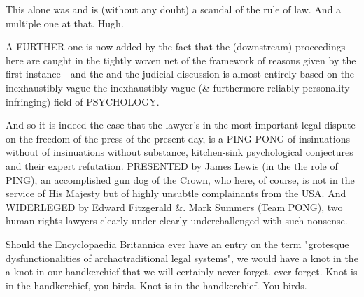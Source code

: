 \begin{multicols}{2}
This alone was and is (without any doubt) a scandal of the rule of law. And a multiple one at that. Hugh.

A FURTHER one is now added by the fact that the
(downstream) proceedings here are caught in the tightly woven net of the framework of reasons given by the first instance - and the
and the judicial discussion is almost entirely based on the inexhaustibly vague
the inexhaustibly vague (\& furthermore reliably personality-infringing) field of PSYCHOLOGY.

And so it is indeed the case that the lawyer's
in the most important legal dispute on the freedom of the press of the present day, is a PING PONG of insinuations without
of insinuations without substance, kitchen-sink psychological conjectures and their expert refutation. PRESENTED by James Lewis (in the
the role of PING), an accomplished gun dog of the
Crown, who here, of course, is not in the service of His Majesty but of highly unsubtle complainants from the
USA. And WIDERLEGED by Edward Fitzgerald \&.
Mark Summers (Team PONG), two human rights lawyers clearly under
clearly underchallenged with such nonsense.

Should the Encyclopaedia Britannica ever have an entry on the
term "grotesque dysfunctionalities of archaotraditional legal systems", we would have a knot in the
a knot in our handkerchief that we will certainly never forget.
ever forget. Knot is in the handkerchief, you birds. Knot is in
the handkerchief. You birds.




\end{multicols}
